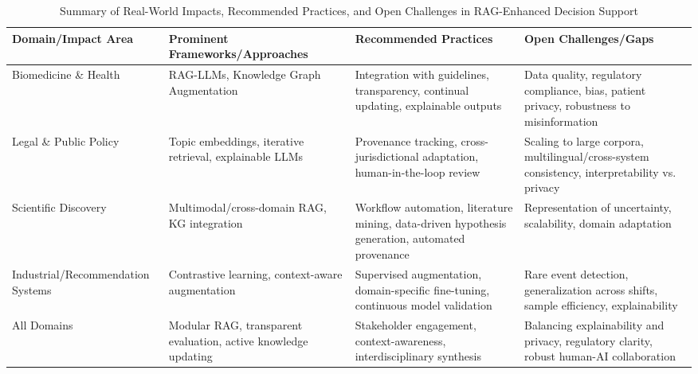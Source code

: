\documentclass[sigconf]{acmart}
\begin{document}
\begin{table*}[htbp]
\centering
\caption{Summary of Real-World Impacts, Recommended Practices, and Open Challenges in RAG-Enhanced Decision Support}
\label{tab:vision-roadmap}
\begin{adjustbox}{max width=\textwidth}
\begin{tabular}{@{}llll@{}}
\toprule
\textbf{Domain/Impact Area} & \textbf{Prominent Frameworks/Approaches} & \textbf{Recommended Practices} & \textbf{Open Challenges/Gaps} \\
\midrule
Biomedicine \& Health & RAG-LLMs, Knowledge Graph Augmentation~\cite{ref1,ref2,ref5,ref48} & Integration with guidelines, transparency, continual updating, explainable outputs & Data quality, regulatory compliance, bias, patient privacy, robustness to misinformation~\cite{ref5,ref9,ref48} \\
Legal \& Public Policy & Topic embeddings, iterative retrieval, explainable LLMs~\cite{ref13,ref20,ref21,ref36} & Provenance tracking, cross-jurisdictional adaptation, human-in-the-loop review & Scaling to large corpora, multilingual/cross-system consistency, interpretability vs. privacy~\cite{ref36} \\
Scientific Discovery & Multimodal/cross-domain RAG, KG integration~\cite{ref12,ref15,ref19,ref24} & Workflow automation, literature mining, data-driven hypothesis generation, automated provenance & Representation of uncertainty, scalability, domain adaptation \\
Industrial/Recommendation Systems & Contrastive learning, context-aware augmentation~\cite{ref11,ref58,ref59,ref60,ref61} & Supervised augmentation, domain-specific fine-tuning, continuous model validation & Rare event detection, generalization across shifts, sample efficiency, explainability \\
All Domains & Modular RAG, transparent evaluation, active knowledge updating~\cite{ref8,ref22,ref34,ref36,ref40} & Stakeholder engagement, context-awareness, interdisciplinary synthesis & Balancing explainability and privacy, regulatory clarity, robust human-AI collaboration~\cite{ref36,ref48,ref50} \\
\bottomrule
\end{tabular}
\end{adjustbox}
\end{table*}
\end{document}

